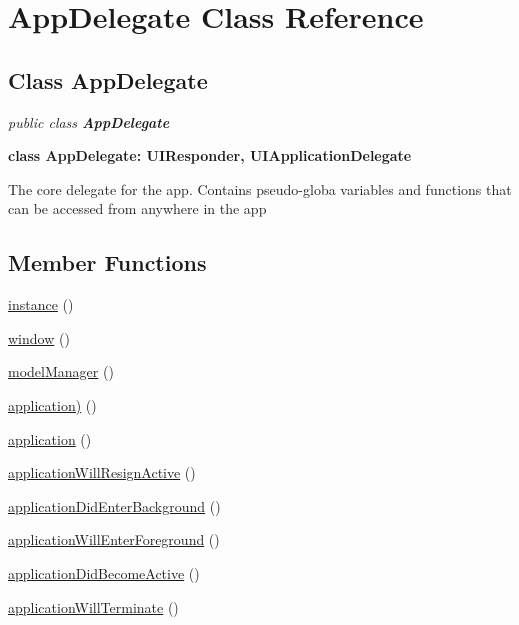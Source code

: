 
\hypertarget{class_AppDelegate.iOS}{\section{AppDelegate Class Reference}
\label{class_AppDelegate.iOS}
}

\subsection*{Class AppDelegate}

\textit{public class \textbf{AppDelegate}}

\tab \textbf{class AppDelegate: UIResponder, UIApplicationDelegate}

The core delegate for the app. Contains pseudo-globa variables and functions that can be accessed from anywhere in the app\\

\subsection*{Member Functions}
\begin{DoxyCompactItemize}
\item 
\hyperlink{class_AppDelegate.iOS.instance}{instance} ()
\item 
\hyperlink{class_AppDelegate.iOS.window}{window} ()
\item 
\hyperlink{class_AppDelegate.iOS.modelManager}{modelManager} ()
\item 
\hyperlink{class_AppDelegate.iOS.application}{application)} ()
\item 
\hyperlink{class_AppDelegate.iOS.application2}{application} ()
\item 
\hyperlink{class_AppDelegate.iOS.applicationWillResignActive}{applicationWillResignActive} ()
\item 
\hyperlink{class_AppDelegate.iOS.applicationDidEnterBackground}{applicationDidEnterBackground} ()
\item 
\hyperlink{class_AppDelegate.iOS.applicationWillEnterForeground}{applicationWillEnterForeground} ()
\item 
\hyperlink{class_AppDelegate.iOS.applicationDidBecomeActive}{applicationDidBecomeActive} ()
\item 
\hyperlink{class_AppDelegate.iOS.applicationWillTerminate}{applicationWillTerminate} ()
\end{DoxyCompactItemize}




